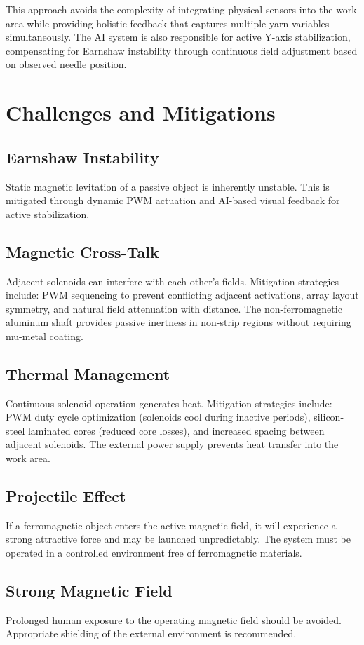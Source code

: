 \documentclass[10pt]{article}
\begin{document}
This approach avoids the complexity of integrating physical sensors into the work area while providing holistic feedback that captures multiple yarn variables simultaneously. The AI system is also responsible for active Y-axis stabilization, compensating for Earnshaw instability through continuous field adjustment based on observed needle position.

\section{Challenges and Mitigations}
\subsection{Earnshaw Instability}
Static magnetic levitation of a passive object is inherently unstable. This is mitigated through dynamic PWM actuation and AI-based visual feedback for active stabilization.

\subsection{Magnetic Cross-Talk}
Adjacent solenoids can interfere with each other's fields. Mitigation strategies include: PWM sequencing to prevent conflicting adjacent activations, array layout symmetry, and natural field attenuation with distance. The non-ferromagnetic aluminum shaft provides passive inertness in non-strip regions without requiring mu-metal coating.

\subsection{Thermal Management}
Continuous solenoid operation generates heat. Mitigation strategies include: PWM duty cycle optimization (solenoids cool during inactive periods), silicon-steel laminated cores (reduced core losses), and increased spacing between adjacent solenoids. The external power supply prevents heat transfer into the work area.

\subsection{Projectile Effect}
If a ferromagnetic object enters the active magnetic field, it will experience a strong attractive force and may be launched unpredictably. The system must be operated in a controlled environment free of ferromagnetic materials.

\subsection{Strong Magnetic Field}
Prolonged human exposure to the operating magnetic field should be avoided. Appropriate shielding of the external environment is recommended.
\end{document}
